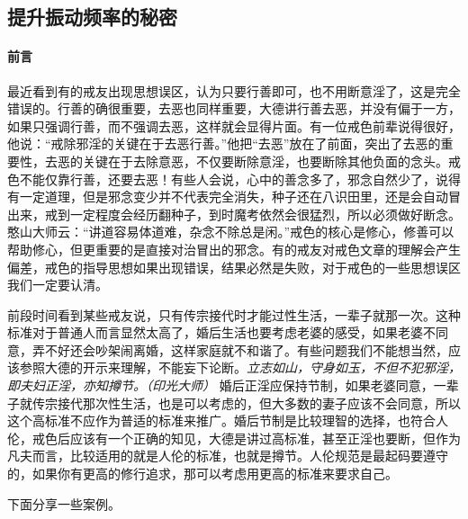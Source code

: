 \subsection{提升振动频率的秘密}

\paragraph*{前言}

最近看到有的戒友出现思想误区，认为只要行善即可，也不用断意淫了，这是完全错误的。行善的确很重要，去恶也同样重要，大德讲行善去恶，并没有偏于一方，如果只强调行善，而不强调去恶，这样就会显得片面。有一位戒色前辈说得很好，他说：“戒除邪淫的关键在于去恶行善。”他把“去恶”放在了前面，突出了去恶的重要性，去恶的关键在于去除意恶，不仅要断除意淫，也要断除其他负面的念头。戒色不能仅靠行善，还要去恶！有些人会说，心中的善念多了，邪念自然少了，说得有一定道理，但是邪念变少并不代表完全消失，种子还在八识田里，还是会自动冒出来，戒到一定程度会经历翻种子，到时魔考依然会很猛烈，所以必须做好断念。憨山大师云：“讲道容易体道难，杂念不除总是闲。”戒色的核心是修心，修善可以帮助修心，但更重要的是直接对治冒出的邪念。有的戒友对戒色文章的理解会产生偏差，戒色的指导思想如果出现错误，结果必然是失败，对于戒色的一些思想误区我们一定要认清。

前段时间看到某些戒友说，只有传宗接代时才能过性生活，一辈子就那一次。这种标准对于普通人而言显然太高了，婚后生活也要考虑老婆的感受，如果老婆不同意，弄不好还会吵架闹离婚，这样家庭就不和谐了。有些问题我们不能想当然，应该参照大德的开示来理解，不能妄下论断。\textit{立志如山，守身如玉，不但不犯邪淫，即夫妇正淫，亦知撙节。（印光大师）} 婚后正淫应保持节制，如果老婆同意，一辈子就传宗接代那次性生活，也是可以考虑的，但大多数的妻子应该不会同意，所以这个高标准不应作为普适的标准来推广。婚后节制是比较理智的选择，也符合人伦，戒色后应该有一个正确的知见，大德是讲过高标准，甚至正淫也要断，但作为凡夫而言，比较适用的就是人伦的标准，也就是撙节。人伦规范是最起码要遵守的，如果你有更高的修行追求，那可以考虑用更高的标准来要求自己。

下面分享一些案例。

